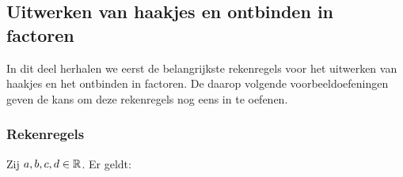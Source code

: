 \documentclass{ximera}
\begin{document}
    \author{Zomercursus KU Leuven}

\subsection{Uitwerken van haakjes en ontbinden in factoren}
In dit deel herhalen we eerst de belangrijkste rekenregels voor
het uitwerken van haakjes en het ontbinden in factoren. De daarop
volgende voorbeeldoefeningen geven de kans om deze rekenregels nog
eens in te oefenen.


\subsubsection*{Rekenregels}
Zij $a,b,c,d\in \mathbb{R}$. Er geldt:\\
\end{document}

